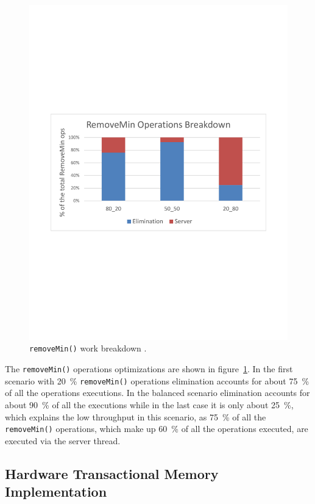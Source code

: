 \begin{figure}[htb]
\begin{minipage}[b]{.495\textwidth}
		\includegraphics[width=\linewidth]{graphics/sparc-rem-brk.pdf}
		\caption{\texttt{removeMin()} work breakdown \cite{calciu_adaptive_2014}.}
		\label{fig:sparc_rem}
	\end{minipage}
\end{figure}

The \texttt{removeMin()} operations optimizations are shown in figure~\ref{fig:sparc_rem}. In the first scenario with 20~\% \texttt{removeMin()} operations elimination accounts for about 75~\% of all the operations executions. In the balanced scenario elimination accounts for about 90~\% of all the executions while in the last case it is only about 25~\%, which explains the low throughput in this scenario, as 75~\% of all the \texttt{removeMin()} operations, which make up 60~\% of all the operations executed, are executed via the server thread.

\subsection{Hardware Transactional Memory Implementation}

